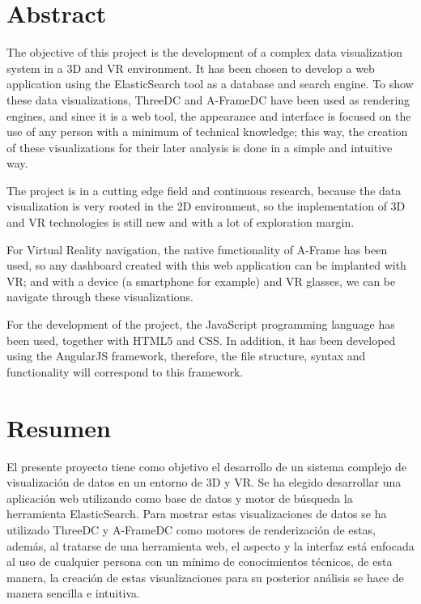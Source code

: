 \documentclass[a4paper, 12pt]{book}
\begin{document}
\chapter*{Abstract}
The objective of this project is the development of a complex data visualization system in a 3D and VR environment. It has been chosen to develop a web application using the ElasticSearch tool as a database and search engine. To show these data visualizations, ThreeDC and A-FrameDC have been used as rendering engines, and since it is a web tool, the appearance and interface is focused on the use of any person with a minimum of technical knowledge; this way, the creation of these visualizations for their later analysis is done in a simple and intuitive way.

The project is in a cutting edge field and continuous research, because the data visualization is very rooted in the 2D environment, so the implementation of 3D and VR technologies is still new and with a lot of exploration margin.

For Virtual Reality navigation, the native functionality of A-Frame has been used, so any dashboard created with this web application can be implanted with VR; and with a device (a smartphone for example) and VR glasses, we can be navigate through these visualizations.

For the development of the project, the JavaScript programming language has been used, together with HTML5 and CSS. In addition, it has been developed using the AngularJS framework, therefore, the file structure, syntax and functionality will correspond to this framework.


\chapter*{Resumen}

El presente proyecto tiene como objetivo el desarrollo de un sistema complejo de visualización de datos en un entorno de 3D y VR. Se ha elegido desarrollar una aplicación web utilizando como base de datos y motor de búsqueda la herramienta ElasticSearch. Para mostrar estas visualizaciones de datos se ha utilizado ThreeDC y A-FrameDC como motores de renderización de estas, además, al tratarse de una herramienta web, el aspecto y la interfaz está enfocada al uso de cualquier persona con un mínimo de conocimientos técnicos, de esta manera, la creación de estas visualizaciones para su posterior análisis se hace de manera sencilla e intuitiva.
\end{document}
